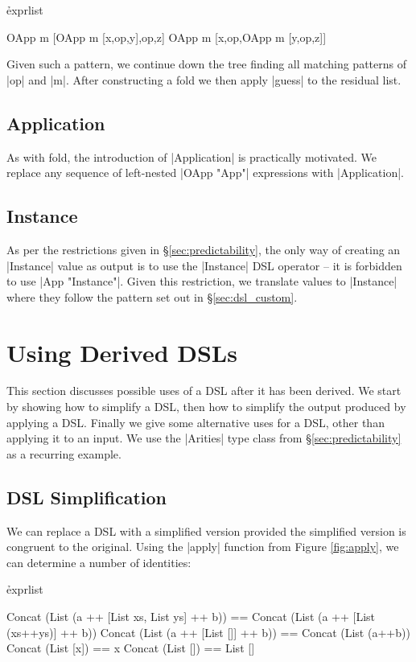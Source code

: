 \documentclass{llncs}
\begin{document}
\h{exprlist}\begin{code}
OApp m [OApp m [x,op,y],op,z]
OApp m [x,op,OApp m [y,op,z]]
\end{code}

Given such a pattern, we continue down the tree finding all matching patterns of |op| and |m|. After constructing a fold we then apply |guess| to the residual list.

\subsection{Application}

As with fold, the introduction of |Application| is practically motivated. We replace any sequence of left-nested |OApp "App"| expressions with |Application|.

\subsection{Instance}

As per the restrictions given in \S\ref{sec:predictability}, the only way of creating an |Instance| value as output is to use the |Instance| DSL operator -- it is forbidden to use |App "Instance"|. Given this restriction, we translate values to |Instance| where they follow the pattern set out in \S\ref{sec:dsl_custom}.

\section{Using Derived DSLs}
\label{sec:using}

This section discusses possible uses of a DSL after it has been derived. We start by showing how to simplify a DSL, then how to simplify the output produced by applying a DSL. Finally we give some alternative uses for a DSL, other than applying it to an input. We use the |Arities| type class from \S\ref{sec:predictability} as a recurring example.

\subsection{DSL Simplification}
\label{sec:dsl_simplify}

We can replace a DSL with a simplified version provided the simplified version is congruent to the original. Using the |apply| function from Figure \ref{fig:apply}, we can determine a number of identities:

\h{exprlist}\begin{code}
Concat (List (a ++ [List xs, List ys] ++ b)) ==
    Concat (List (a ++ [List (xs++ys)] ++ b))
Concat (List (a ++ [List []] ++ b)) == Concat (List (a++b))
Concat (List [x]) == x
Concat (List []) == List []
\end{code}
\end{document}

